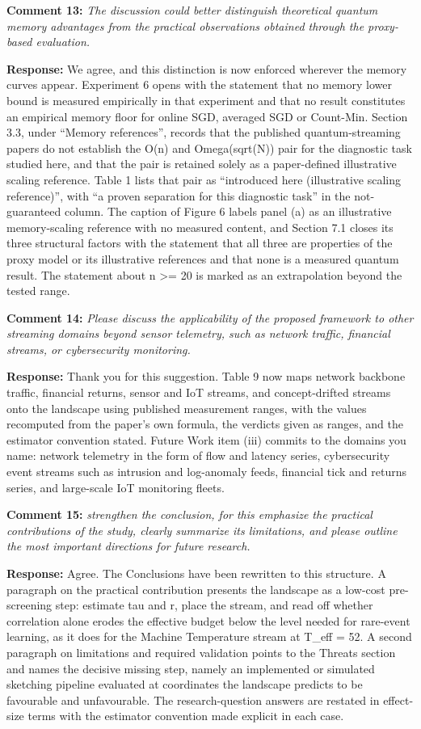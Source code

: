 \documentclass[
  11pt,
]{article}
\begin{document}
\textbf{Comment 13:} \emph{The discussion could better distinguish
theoretical quantum memory advantages from the practical observations
obtained through the proxy-based evaluation.}

\textbf{Response:} We agree, and this distinction is now enforced
wherever the memory curves appear. Experiment 6 opens with the statement
that no memory lower bound is measured empirically in that experiment
and that no result constitutes an empirical memory floor for online SGD,
averaged SGD or Count-Min. Section 3.3, under ``Memory references'',
records that the published quantum-streaming papers do not establish the
O(n) and Omega(sqrt(N)) pair for the diagnostic task studied here, and
that the pair is retained solely as a paper-defined illustrative scaling
reference. Table 1 lists that pair as ``introduced here (illustrative
scaling reference)'', with ``a proven separation for this diagnostic
task'' in the not-guaranteed column. The caption of Figure 6 labels
panel (a) as an illustrative memory-scaling reference with no measured
content, and Section 7.1 closes its three structural factors with the
statement that all three are properties of the proxy model or its
illustrative references and that none is a measured quantum result. The
statement about n \textgreater= 20 is marked as an extrapolation beyond
the tested range.

\textbf{Comment 14:} \emph{Please discuss the applicability of the
proposed framework to other streaming domains beyond sensor telemetry,
such as network traffic, financial streams, or cybersecurity
monitoring.}

\textbf{Response:} Thank you for this suggestion. Table 9 now maps
network backbone traffic, financial returns, sensor and IoT streams, and
concept-drifted streams onto the landscape using published measurement
ranges, with the values recomputed from the paper's own formula, the
verdicts given as ranges, and the estimator convention stated. Future
Work item (iii) commits to the domains you name: network telemetry in
the form of flow and latency series, cybersecurity event streams such as
intrusion and log-anomaly feeds, financial tick and returns series, and
large-scale IoT monitoring fleets.

\textbf{Comment 15:} \emph{strengthen the conclusion, for this emphasize
the practical contributions of the study, clearly summarize its
limitations, and please outline the most important directions for future
research.}

\textbf{Response:} Agree. The Conclusions have been rewritten to this
structure. A paragraph on the practical contribution presents the
landscape as a low-cost pre-screening step: estimate tau and r, place
the stream, and read off whether correlation alone erodes the effective
budget below the level needed for rare-event learning, as it does for
the Machine Temperature stream at T\_eff = 52. A second paragraph on
limitations and required validation points to the Threats section and
names the decisive missing step, namely an implemented or simulated
sketching pipeline evaluated at coordinates the landscape predicts to be
favourable and unfavourable. The research-question answers are restated
in effect-size terms with the estimator convention made explicit in each
case.
\end{document}
